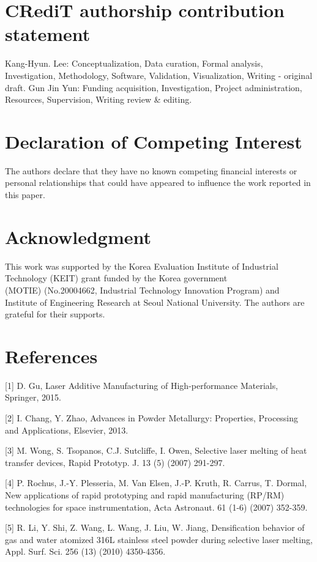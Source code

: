\documentclass[10pt]{article}
\begin{document}
\section*{CRediT authorship contribution statement}
Kang-Hyun. Lee: Conceptualization, Data curation, Formal analysis, Investigation, Methodology, Software, Validation, Visualization, Writing - original draft. Gun Jin Yun: Funding acquisition, Investigation, Project administration, Resources, Supervision, Writing review \& editing.

\section*{Declaration of Competing Interest}
The authors declare that they have no known competing financial interests or personal relationships that could have appeared to influence the work reported in this paper.

\section*{Acknowledgment}
This work was supported by the Korea Evaluation Institute of Industrial Technology (KEIT) grant funded by the Korea government\\
(MOTIE) (No.20004662, Industrial Technology Innovation Program) and Institute of Engineering Research at Seoul National University. The authors are grateful for their supports.

\section*{References}
[1] D. Gu, Laser Additive Manufacturing of High-performance Materials, Springer, 2015.

[2] I. Chang, Y. Zhao, Advances in Powder Metallurgy: Properties, Processing and Applications, Elsevier, 2013.

[3] M. Wong, S. Tsopanos, C.J. Sutcliffe, I. Owen, Selective laser melting of heat transfer devices, Rapid Prototyp. J. 13 (5) (2007) 291-297.

[4] P. Rochus, J.-Y. Plesseria, M. Van Elsen, J.-P. Kruth, R. Carrus, T. Dormal, New applications of rapid prototyping and rapid manufacturing (RP/RM) technologies for space instrumentation, Acta Astronaut. 61 (1-6) (2007) 352-359.

[5] R. Li, Y. Shi, Z. Wang, L. Wang, J. Liu, W. Jiang, Densification behavior of gas and water atomized 316L stainless steel powder during selective laser melting, Appl. Surf. Sci. 256 (13) (2010) 4350-4356.
\end{document}
